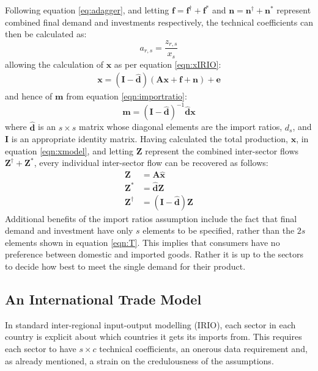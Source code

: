 \documentclass[a4paper]{article}
\begin{document}
Following equation \eqref{eq:adagger}, and letting $\boldsymbol{f} = \boldsymbol{f}^{\dagger} + \boldsymbol{f}^{*}$ and $\boldsymbol{n} = \boldsymbol{n}^{\dagger} + \boldsymbol{n}^{*}$ represent combined final demand and investments respectively, the technical coefficients can then be calculated as:
\begin{equation}
a_{r,s} = \frac{z_{r,s}}{x_s}
\end{equation}
allowing the calculation of $\boldsymbol{x}$ as per equation \eqref{eqn:xIRIO}:
\begin{align}
\boldsymbol{x} 
= 
(\boldsymbol{I} - \boldsymbol{\hat{d}})
(
\boldsymbol{Ax} + 
\boldsymbol{f} + \boldsymbol{n}
)
+ \boldsymbol{e}
\label{eqn:xmodel}
\end{align}
and hence of $\boldsymbol{m}$ from equation \eqref{eqn:importratio}:
\begin{equation}
\boldsymbol{m} = 
(\boldsymbol{I} - 
\boldsymbol{\hat{d}})^{-1} 
\boldsymbol{\hat{d}}\boldsymbol{x}\label{eqn:mmodel}
\end{equation}
where $\boldsymbol{\hat{d}}$ is an $s \times s$ matrix whose diagonal elements are the import ratios, $d_s$, and $\boldsymbol{I}$ is an appropriate identity matrix.
Having calculated the total production, $\boldsymbol{x}$, in equation \eqref{eqn:xmodel}, and letting $\boldsymbol{Z}$ represent the combined inter-sector flows $\boldsymbol{Z}^{\dagger} + \boldsymbol{Z}^{*}$, every individual inter-sector flow can be recovered as follows:
\begin{align}
\boldsymbol{Z}& = \boldsymbol{A}\boldsymbol{\hat{x}}\nonumber\\
\boldsymbol{Z^*}& = \boldsymbol{\hat{d}}\boldsymbol{Z}\\
\boldsymbol{Z^\dagger}& = (\boldsymbol{I} - \boldsymbol{\hat{d}})
	\boldsymbol{Z}\label{eqn:zstar}
\end{align}
Additional benefits of the import ratios assumption include the fact that final demand and investment have only $s$ elements to be specified, rather than the $2s$ elements shown in equation \eqref{eqn:T}.
This implies that consumers have no preference between domestic and imported goods.
Rather it is up to the sectors to decide how best to meet the single demand for their product.

\subsection{An International Trade Model}\label{sec:trade}
In standard inter-regional input-output modelling (IRIO), each sector in each country is explicit about which countries it gets its imports from. 
This requires each sector to have $s \times c$ technical coefficients, an onerous data requirement and, as already mentioned, a strain on the credulousness of the assumptions. 
\end{document}
